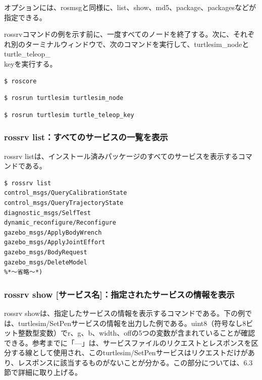 オプションには、rosmsgと同様に、list、show、md5、package、packagesなどが指定できる。

rossrvコマンドの例を示す前に、一度すべてのノードを終了する。次に、それぞれ別のターミナルウィンドウで、次のコマンドを実行して、turtlesim\_nodeとturtle\_teleop\_\\keyを実行する。

\begin{lstlisting}[language=ROS]
$ roscore
\end{lstlisting}

\begin{lstlisting}[language=ROS]
$ rosrun turtlesim turtlesim_node
\end{lstlisting}

\begin{lstlisting}[language=ROS]
$ rosrun turtlesim turtle_teleop_key
\end{lstlisting}


\subsubsection{rossrv list：すべてのサービスの一覧を表示}

rossrv listは、インストール済みパッケージのすべてのサービスを表示するコマンドである。

\begin{lstlisting}[language=ROS]
$ rossrv list
control_msgs/QueryCalibrationState
control_msgs/QueryTrajectoryState
diagnostic_msgs/SelfTest
dynamic_reconfigure/Reconfigure
gazebo_msgs/ApplyBodyWrench
gazebo_msgs/ApplyJointEffort
gazebo_msgs/BodyRequest
gazebo_msgs/DeleteModel
%*〜省略〜*)
\end{lstlisting}

\subsubsection{rossrv show [サービス名]：指定されたサービスの情報を表示}

rossrv showは、指定したサービスの情報を表示するコマンドである。下の例では、turtlesim/SetPenサービスの情報を出力した例である。uint8（符号なし8ビット整数型変数）でr、g、b、width、offの5つの変数が含まれていることが確認できる。参考までに「---」は、サービスファイルのリクエストとレスポンスを区分する線として使用され、このturtlesim/SetPenサービスはリクエストだけがあり、レスポンスに該当するものがないことが分かる。この部分については、6.3節で詳細に取り上げる。

